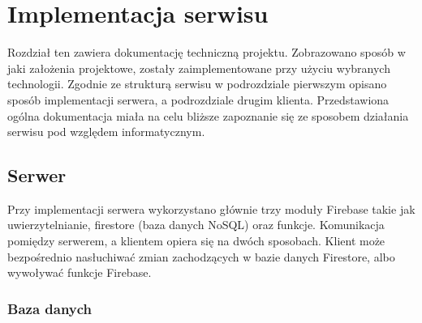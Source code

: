 \chapter{Implementacja serwisu}
\thispagestyle{chapterBeginStyle}

Rozdział ten zawiera dokumentację techniczną projektu. Zobrazowano sposób w jaki założenia projektowe, zostały zaimplementowane przy użyciu wybranych technologii. Zgodnie ze strukturą serwisu w podrozdziale pierwszym opisano sposób implementacji serwera, a podrozdziale drugim klienta. Przedstawiona ogólna dokumentacja miała na celu bliższe zapoznanie się ze sposobem działania serwisu pod względem informatycznym.

\section{Serwer}

Przy implementacji serwera wykorzystano głównie trzy moduły Firebase takie jak uwierzytelnianie, firestore (baza danych NoSQL) oraz funkcje. Komunikacja pomiędzy serwerem, a klientem opiera się na dwóch sposobach. Klient może bezpośrednio nasłuchiwać zmian zachodzących w bazie danych Firestore, albo wywoływać funkcje Firebase.

\subsection{Baza danych}

